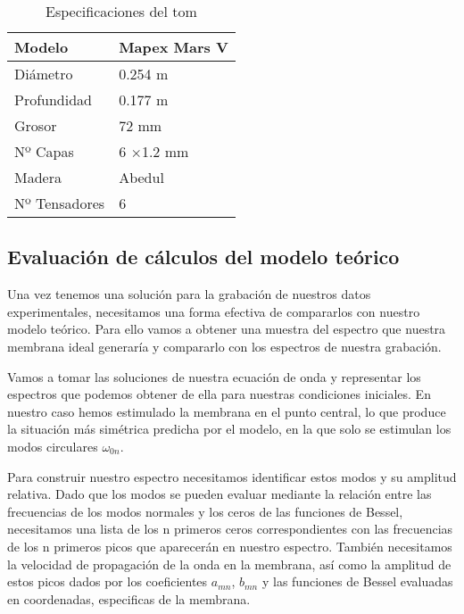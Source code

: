 \documentclass[journal, a4paper,onecolumn]{IEEEtran}
\begin{document}
\begin{table}[H]
\centering
\begin{tabular}{l|l}
Modelo        & Mapex Mars V     \\ \hline
Diámetro      & 0.254 m          \\ \hline
Profundidad   & 0.177 m          \\ \hline
Grosor        & 72 mm            \\ \hline
Nº Capas      & 6 $\times$1.2 mm \\ \hline
Madera        & Abedul           \\ \hline
Nº Tensadores & 6               
\end{tabular}
\caption{Especificaciones del tom}
\end{table}

\subsection{Evaluación de cálculos del modelo teórico}
    
Una vez tenemos una solución para la grabación de nuestros datos experimentales, necesitamos una forma efectiva de compararlos con nuestro modelo teórico. Para ello vamos a obtener una muestra del espectro que nuestra membrana ideal generaría y compararlo con los espectros de nuestra grabación.
\newline

Vamos a tomar las soluciones de nuestra ecuación de onda y representar los espectros que podemos obtener de ella para nuestras condiciones iniciales. En nuestro caso hemos estimulado la membrana en el punto central, lo que produce la situación más simétrica predicha por el modelo, en la que solo se estimulan los modos circulares $\omega_{0n}$.
\newline

Para construir nuestro espectro necesitamos identificar estos modos y su amplitud relativa. Dado que los modos se pueden evaluar mediante la relación entre las frecuencias de los modos normales y los ceros de las funciones de Bessel, necesitamos una lista de los n primeros ceros correspondientes con las frecuencias de los n primeros picos que aparecerán en nuestro espectro. También necesitamos la velocidad de propagación de la onda en la membrana, así como la amplitud de estos picos dados por los coeficientes $a_{mn}$, $b_{mn}$ y las funciones de Bessel evaluadas en coordenadas, especificas de la membrana. \newline
\end{document}
